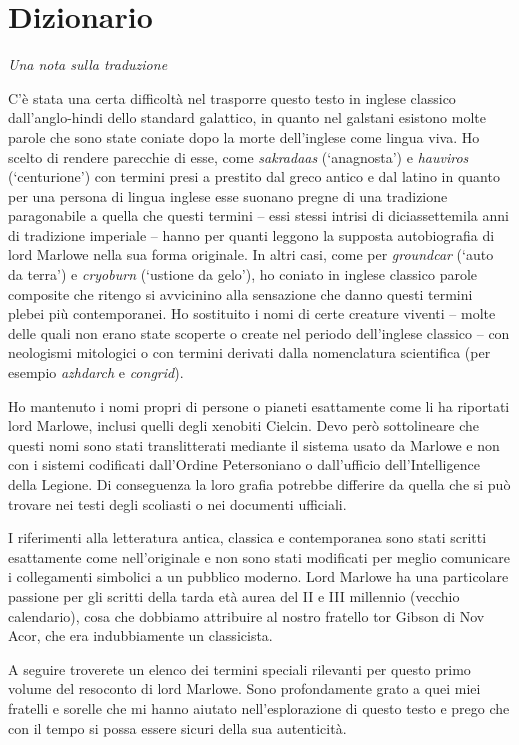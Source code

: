 \chapter{Dizionario}

\emph{Una nota sulla traduzione}

C'è stata una certa difficoltà nel trasporre questo testo in inglese
classico dall'anglo-hindi dello standard galattico, in quanto nel
galstani esistono molte parole che sono state coniate dopo la morte
dell'inglese come lingua viva. Ho scelto di rendere parecchie di esse,
come \emph{sakradaas} (`anagnosta') e \emph{hauviros} (`centurione') con
termini presi a prestito dal greco antico e dal latino in quanto per una
persona di lingua inglese esse suonano pregne di una tradizione
paragonabile a quella che questi termini -- essi stessi intrisi di
diciassettemila anni di tradizione imperiale -- hanno per quanti leggono
la supposta autobiografia di lord Marlowe nella sua forma originale. In
altri casi, come per \emph{groundcar} (`auto da terra') e
\emph{cryoburn} (`ustione da gelo'), ho coniato in inglese classico
parole composite che ritengo si avvicinino alla sensazione che danno
questi termini plebei più contemporanei. Ho sostituito i nomi di certe
creature viventi -- molte delle quali non erano state scoperte o create
nel periodo dell'inglese classico -- con neologismi mitologici o con
termini derivati dalla nomenclatura scientifica (per esempio
\emph{azhdarch} e \emph{congrid}).

Ho mantenuto i nomi propri di persone o pianeti esattamente come li ha
riportati lord Marlowe, inclusi quelli degli xenobiti Cielcin. Devo però
sottolineare che questi nomi sono stati translitterati mediante il
sistema usato da Marlowe e non con i sistemi codificati dall'Ordine
Petersoniano o dall'ufficio dell'Intelligence della Legione. Di
conseguenza la loro grafia potrebbe differire da quella che si può
trovare nei testi degli scoliasti o nei documenti ufficiali.

I riferimenti alla letteratura antica, classica e contemporanea sono
stati scritti esattamente come nell'originale e non sono stati
modificati per meglio comunicare i collegamenti simbolici a un pubblico
moderno. Lord Marlowe ha una particolare passione per gli scritti della
tarda età aurea del II e III millennio (vecchio calendario), cosa che
dobbiamo attribuire al nostro fratello tor Gibson di Nov Acor, che era
indubbiamente un classicista.

A seguire troverete un elenco dei termini speciali rilevanti per questo
primo volume del resoconto di lord Marlowe. Sono profondamente grato a
quei miei fratelli e sorelle che mi hanno aiutato nell'esplorazione di
questo testo e prego che con il tempo si possa essere sicuri della sua
autenticità.

